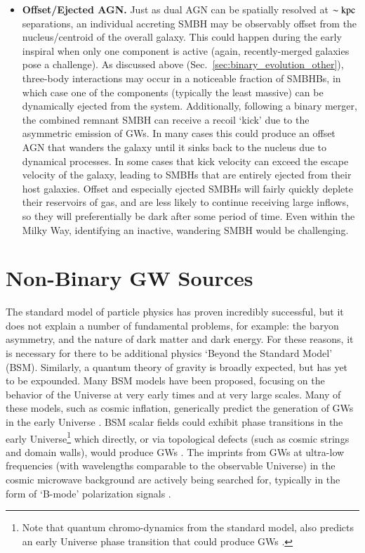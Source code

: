 \documentclass[onecolumn,authoryear]{els-mrw}
\begin{document}
\begin{itemize}
    \item \textbf{Offset/Ejected AGN.}  Just as dual AGN can be spatially resolved at $\sim \mathrm{kpc}$ separations, an individual accreting SMBH may be observably offset from the nucleus/centroid of the overall galaxy.  This could happen during the early inspiral when only one component is active (again, recently-merged galaxies pose a challenge).  As discussed above (Sec.~\ref{sec:binary_evolution_other}), three-body interactions may occur in a noticeable fraction of SMBHBs, in which case one of the components (typically the least massive) can be dynamically ejected from the system.  Additionally, following a binary merger, the combined remnant SMBH can receive a recoil `kick' due to the asymmetric emission of GWs.  In many cases this could produce an offset AGN that wanders the galaxy until it sinks back to the nucleus due to dynamical processes.  In some cases that kick velocity can exceed the escape velocity of the galaxy, leading to SMBHs that are entirely ejected from their host galaxies.  Offset and especially ejected SMBHs will fairly quickly deplete their reservoirs of gas, and are less likely to continue receiving large inflows, so they will preferentially be dark after some period of time.  Even within the Milky Way, identifying an inactive, wandering SMBH would be challenging.
\end{itemize}





\section{Non-Binary GW Sources}\label{sec:cosmo}

The standard model of particle physics has proven incredibly successful, but it does not explain a number of fundamental problems, for example: the baryon asymmetry, and the nature of dark matter and dark energy.  For these reasons, it is necessary for there to be additional physics `Beyond the Standard Model' (BSM).  Similarly, a quantum theory of gravity is broadly expected, but has yet to be expounded.  Many BSM models have been proposed, focusing on the behavior of the Universe at very early times and at very large scales.  Many of these models, such as cosmic inflation, generically predict the generation of GWs in the early Universe \citep{Maggiore-2000}.  BSM scalar fields could exhibit phase transitions in the early Universe\footnote{Note that quantum chromo-dynamics from the standard model, also predicts an early Universe phase transition that could produce GWs \citep{Witten-1984}.} which directly, or via topological defects (such as cosmic strings and domain walls), would produce GWs \citep{Kibble-1976}.  The imprints from GWs at ultra-low frequencies (with wavelengths comparable to the observable Universe) in the cosmic microwave background are actively being searched for, typically in the form of `B-mode' polarization signals \citep{Hu+White-1997}.
\end{document}
